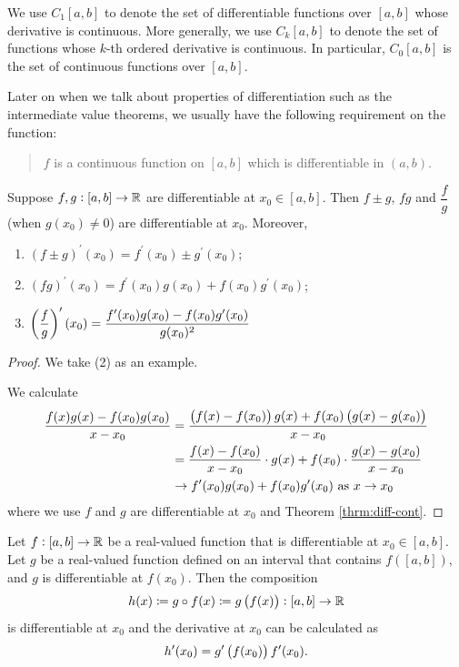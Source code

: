 \begin{notation}
We use $C_1[a,b]$ to denote the set of differentiable functions over $[a,b]$ whose derivative is continuous. More generally, we use $C_k[a,b]$ to denote the set of functions whose $k$-th ordered derivative is continuous. In particular, $C_0[a,b]$ is the set of continuous functions over $[a,b]$.
\end{notation}

Later on when we talk about properties of differentiation such as the intermediate value theorems, we usually have the following requirement on the function:
\begin{quote}
$f$ is a continuous function on $[a,b]$ which is differentiable in $(a,b)$.
\end{quote}

\begin{theorem}
Suppose $f,g:[a,b]\to\mathbb R$ are differentiable at $x_0\in[a,b]$. Then $f\pm g$, $fg$ and $\dfrac{f}{g}$ (when $g(x_0)\neq0$) are differentiable at $x_0$. Moreover,
\begin{enumerate}[label=(\arabic*)]
\item $(f\pm g)^\prime(x_0)=f^\prime(x_0)\pm g^\prime(x_0)$;
\item $(fg)^\prime(x_0)=f^\prime(x_0)g(x_0)+f(x_0)g^\prime(x_0)$;
\item $\displaystyle\left(\frac{f}{g}\right)^\prime(x_0)=\frac{f^\prime(x_0)g(x_0)-f(x_0)g^\prime(x_0)}{g(x_0)^2}$
\end{enumerate}
\end{theorem}

\begin{proof}
We take (2) as an example.

We calculate
\begin{align*}
\frac{f(x)g(x)-f(x_0)g(x_0)}{x-x_0}&=\frac{\left(f(x)-f(x_0)\right)g(x)+f(x_0)\left(g(x)-g(x_0)\right)}{x-x_0}\\
&=\frac{f(x)-f(x_0)}{x-x_0}\cdot g(x)+f(x_0)\cdot\frac{g(x)-g(x_0)}{x-x_0}\\
&\to f^\prime(x_0)g(x_0)+f(x_0)g^\prime(x_0)\text{ as }x\to x_0
\end{align*}
where we use $f$ and $g$ are differentiable at $x_0$ and Theorem \ref{thrm:diff-cont}.
\end{proof}

\begin{theorem}
Let $f:[a,b]\to\mathbb R$ be a real-valued function that is differentiable at $x_0\in[a,b]$. Let $g$ be a real-valued function defined on an interval that contains $f([a,b])$, and $g$ is differentiable at $f(x_0)$. Then the composition
\[ h(x)\coloneqq g\circ f(x)\coloneqq g\left(f(x)\right):[a,b]\to\mathbb R \]
is differentiable at $x_0$ and the derivative at $x_0$ can be calculated as
\[ h^\prime(x_0)=g^\prime\left(f(x_0)\right)f^\prime(x_0). \]
\end{theorem}

